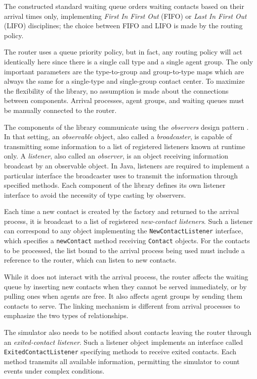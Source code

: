 The constructed standard waiting queue
orders waiting contacts based on their arrival times only,
implementing \emph{First In First Out} (FIFO) or \emph{Last In First
  Out} (LIFO) disciplines; the choice between FIFO and LIFO is made by
the routing policy.

The router uses a queue priority policy, but in
fact, any routing policy will act identically here since there is a
single call type and a single agent group.  The only important parameters
are the type-to-group and group-to-type maps which are always the same
for a single-type and single-group contact center.
To maximize the flexibility of the
library, no assumption is made about the connections between
components.  Arrival processes, agent groups,
and waiting queues must be manually connected
to the router.

The components of the library communicate using the \emph{observers} design pattern
\cite{iGAM98a}.  In that setting, an \emph{observable}
object, also called a \emph{broadcaster}, is
capable of transmitting some information to a list of registered
listeners known at runtime only.
A \emph{listener}, also called an \emph{observer}, is an object
receiving information
broadcast by an observable object.
In Java, listeners are required to implement a particular interface the
broadcaster uses to transmit the information through specified
methods.
Each component of the library defines its own listener interface to
avoid the necessity of type casting by observers.

Each time
a new contact is created by the factory and returned to the arrival
process, it is broadcast to a list of registered \emph{new-contact
  listeners}.  Such a listener can correspond to any object
implementing the \texttt{New\-Contact\-Listener} interface, which
specifies a \texttt{new\-Contact} method receiving \texttt{Contact}
objects.  For the contacts to be processed, the list bound to the
arrival process being used
must include a reference to the router, which can listen to new
contacts.

While it
does not interact with the arrival process, the router affects the
waiting queue by inserting new contacts when they cannot be served
immediately, or by
pulling ones when agents are free.  It also affects agent
groups by sending them contacts to serve.  The linking mechanism is
different from arrival processes
to emphasize the two types of relationships.

The simulator also needs to be notified
about contacts leaving the router through an
\emph{exited-contact listener}.  Such a listener object implements an
interface called \texttt{Exited\-Contact\-Listener} specifying methods
to receive exited contacts.  Each method transmits all available
information, permitting the simulator to count events under complex
conditions.

